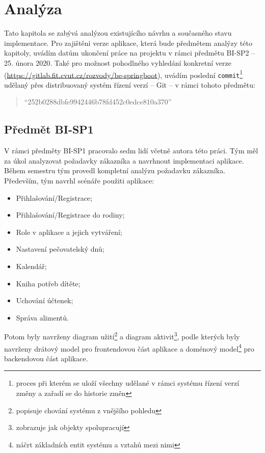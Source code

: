 \chapter{Analýza}\label{chapter:analyza}

Tato kapitola se zabývá analýzou existujícího návrhu a současného stavu implementace. Pro zajištěni verze aplikace, která bude předmětem analýzy této kapitoly, uvádím datům ukončení práce na projektu v rámci předmětu BI-SP2 -- 25. února 2020. Také pro možnost pohodlného vyhledání konkretní verze  (\url{https://gitlab.fit.cvut.cz/rozvody/be-springboot}), uvádím poslední \texttt{commit}\footnote{proces při kterém se uloží všechny udělané v rámci systému řízení verzí změny a zařadí se do historie změn} udělaný přes distribuovaný systém řízení verzí -- Git -- v rámci tohoto předmětu: 
\begin{quote}
    \enquote{252b0288dbfe9942446b78fd452c0edce810a370}
\end{quote}

\section{Předmět BI-SP1}\label{analyza:navrh:sp1}
    V rámci předměty BI-SP1 pracovalo sedm lidí včetně autora této práci. Tým měl za úkol analyzovat požadavky zákazníka a navrhnout implementaci aplikace. Během semestru tým provedl kompletní analýzu požadavku zákazníka. Především, tým navrhl scénáře použiti aplikace:
    \begin{itemize}
	   \item Přihlašování/Registrace;
	   \item Přihlašování/Registrace do rodiny;
	   \item Role v aplikace a jejich vytváření;
	   \item Nastavení pečovatelský dnů;
	   \item Kalendář;
	   \item Kniha potřeb dítěte;
	   \item Uchování účtenek;
	   \item Správa alimentů.
	\end{itemize}
    Potom byly navrženy diagram užití\footnote{popisuje chování systému z vnějšího pohledu} a diagram aktivit\footnote{zobrazuje jak objekty spolupracují}, podle kterých byly navrženy drátový model pro frontendovou část aplikace a doménový model\footnote{náčrt základních entit systému a vztahů mezi nimi} pro backendovou část aplikace. 
    
